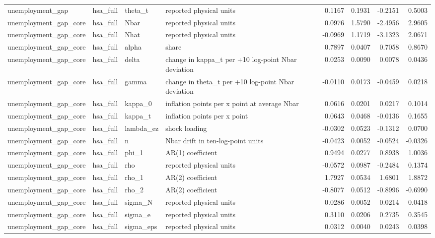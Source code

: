 \begin{tabular}{llllrrrr}
unemployment\_gap & hsa\_full & theta\_t & reported physical units & 0.1167 & 0.1931 & -0.2151 & 0.5003 \\
unemployment\_gap\_core & hsa\_full & Nbar & reported physical units & 0.0976 & 1.5790 & -2.4956 & 2.9605 \\
unemployment\_gap\_core & hsa\_full & Nhat & reported physical units & -0.0969 & 1.1719 & -3.1323 & 2.0671 \\
unemployment\_gap\_core & hsa\_full & alpha & share & 0.7897 & 0.0407 & 0.7058 & 0.8670 \\
unemployment\_gap\_core & hsa\_full & delta & change in kappa\_t per +10 log-point Nbar deviation & 0.0253 & 0.0090 & 0.0078 & 0.0436 \\
unemployment\_gap\_core & hsa\_full & gamma & change in theta\_t per +10 log-point Nbar deviation & -0.0110 & 0.0173 & -0.0459 & 0.0218 \\
unemployment\_gap\_core & hsa\_full & kappa\_0 & inflation points per x point at average Nbar & 0.0616 & 0.0201 & 0.0217 & 0.1014 \\
unemployment\_gap\_core & hsa\_full & kappa\_t & inflation points per x point & 0.0643 & 0.0468 & -0.0136 & 0.1655 \\
unemployment\_gap\_core & hsa\_full & lambda\_ez & shock loading & -0.0302 & 0.0523 & -0.1312 & 0.0700 \\
unemployment\_gap\_core & hsa\_full & n & Nbar drift in ten-log-point units & -0.0423 & 0.0052 & -0.0524 & -0.0326 \\
unemployment\_gap\_core & hsa\_full & phi\_1 & AR(1) coefficient & 0.9494 & 0.0277 & 0.8938 & 1.0036 \\
unemployment\_gap\_core & hsa\_full & rho & reported physical units & -0.0572 & 0.0987 & -0.2484 & 0.1374 \\
unemployment\_gap\_core & hsa\_full & rho\_1 & AR(2) coefficient & 1.7927 & 0.0534 & 1.6801 & 1.8872 \\
unemployment\_gap\_core & hsa\_full & rho\_2 & AR(2) coefficient & -0.8077 & 0.0512 & -0.8996 & -0.6990 \\
unemployment\_gap\_core & hsa\_full & sigma\_N & reported physical units & 0.0286 & 0.0052 & 0.0214 & 0.0418 \\
unemployment\_gap\_core & hsa\_full & sigma\_e & reported physical units & 0.3110 & 0.0206 & 0.2735 & 0.3545 \\
unemployment\_gap\_core & hsa\_full & sigma\_eps & reported physical units & 0.0312 & 0.0040 & 0.0243 & 0.0398 \\

\end{tabular}
